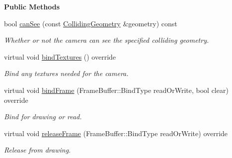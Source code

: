 \begin{Indent}\textbf{ Public Methods}\par
\begin{DoxyCompactItemize}
\item 
\mbox{\label{classrev_1_1_camera_a69ebc868339b31834d085f7032fe4f1f}} 
bool \mbox{\hyperlink{classrev_1_1_camera_a69ebc868339b31834d085f7032fe4f1f}{can\+See}} (const \mbox{\hyperlink{classrev_1_1_colliding_geometry}{Colliding\+Geometry}} \&geometry) const
\begin{DoxyCompactList}\small\item\em Whether or not the camera can see the specified colliding geometry. \end{DoxyCompactList}\item 
\mbox{\label{classrev_1_1_camera_aa060ecbff7313e03c77f523218b171e1}} 
virtual void \mbox{\hyperlink{classrev_1_1_camera_aa060ecbff7313e03c77f523218b171e1}{bind\+Textures}} () override
\begin{DoxyCompactList}\small\item\em Bind any textures needed for the camera. \end{DoxyCompactList}\item 
\mbox{\label{classrev_1_1_camera_a8bc1c039e43edc621ea3d9e94e2a3bb0}} 
virtual void \mbox{\hyperlink{classrev_1_1_camera_a8bc1c039e43edc621ea3d9e94e2a3bb0}{bind\+Frame}} (Frame\+Buffer\+::\+Bind\+Type read\+Or\+Write, bool clear) override
\begin{DoxyCompactList}\small\item\em Bind for drawing or read. \end{DoxyCompactList}\item 
\mbox{\label{classrev_1_1_camera_a46b92956755ef3c1d5800930ed93de36}} 
virtual void \mbox{\hyperlink{classrev_1_1_camera_a46b92956755ef3c1d5800930ed93de36}{release\+Frame}} (Frame\+Buffer\+::\+Bind\+Type read\+Or\+Write) override
\begin{DoxyCompactList}\small\item\em Release from drawing. \end{DoxyCompactList}\item 
\mbox{\label{classrev_1_1_camera_a65f7b476c8d304ceed5ea5b5cd240dd7}} 

\end{DoxyCompactItemize}
\end{Indent}
